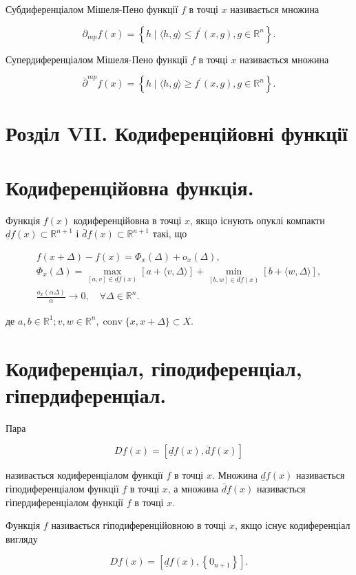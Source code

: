 \documentclass[10pt]{article}
\begin{document}
Субдиференціалом Мішеля-Пено функції $f$ в точці $x$ називається множина

$$
\partial_{m p} f(x)=\left\{h \mid\langle h, g\rangle \leq f^{\prime}(x, g), g \in \mathbb{R}^{n}\right\} .
$$

Супердиференціалом Мішеля-Пено функції $f$ в точці $x$ називається множина

$$
\bar{\partial}^{m p} f(x)=\left\{h \mid\langle h, g\rangle \geq f^{\prime}(x, g), g \in \mathbb{R}^{n}\right\} .
$$

\section*{Розділ VII. Кодиференційовні функції}
\section*{Кодиференційовна функція.}
Функція $f(x)$ кодиференційовна в точці $x$, якщо існують опуклі компакти $\underline{d} f(x) \subset \mathbb{R}^{n+1}$ і $\bar{d} f(x) \subset \mathbb{R}^{n+1}$ такі, що

$$
\begin{gathered}
f(x+\Delta)-f(x)=\Phi_{x}(\Delta)+o_{x}(\Delta), \\
\Phi_{x}(\Delta)=\max _{[a, v] \in \underline{d} f(x)}[a+\langle v, \Delta\rangle]+\min _{[b, w] \in \bar{d} f(x)}[b+\langle w, \Delta\rangle], \\
\frac{o_{x}(\alpha \Delta)}{\alpha} \longrightarrow 0, \quad \forall \Delta \in \mathbb{R}^{n} .
\end{gathered}
$$

де $a, b \in \mathbb{R}^{1} ; v, w \in \mathbb{R}^{n}, \operatorname{conv}\{x, x+\Delta\} \subset X$.

\section*{Кодиференціал, гіподиференціал, гіпердиференціал.}
Пара

$$
D f(x)=[\underline{d} f(x), \bar{d} f(x)]
$$

називається кодиференціалом функції $f$ в точці $x$. Множина $\underline{d} f(x)$ називається гіподиференціалом функції $f$ в точці $x$, а множина $\bar{d} f(x)$ називається гіпердиференціалом функції $f$ в точці $x$.

Функція $f$ називається гіподиференційовною в точці $x$, якщо існує кодиференціал вигляду

$$
D f(x)=\left[\underline{d} f(x),\left\{0_{n+1}\right\}\right] .
$$
\end{document}
